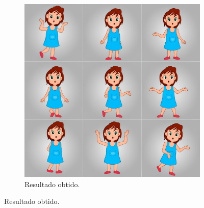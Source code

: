 \begin{figure}[htbp]
\begin{subfigure}{0.45\linewidth}
        \includegraphics[width=1\linewidth]{figs/segmind/segmind_demo_sprite_sheet.jpg}
        \caption{\small Resultado obtido.}
        \label{fig:segmindSpriteSheet}
    \end{subfigure}

\end{figure}

